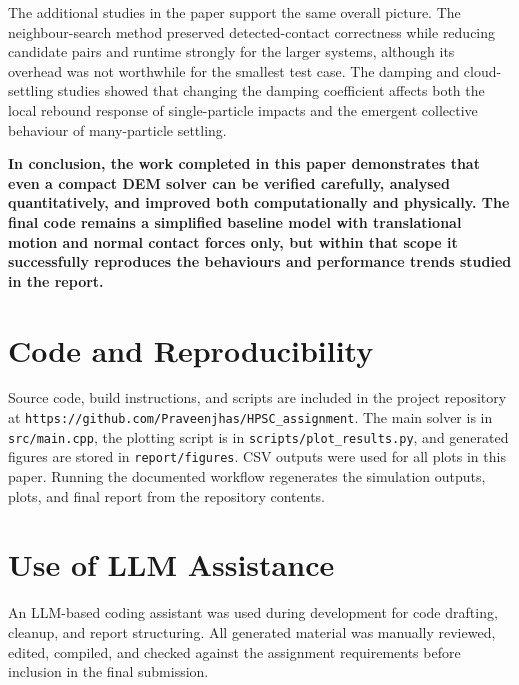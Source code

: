 \documentclass[conference]{IEEEtran}
\begin{document}
The additional studies in the paper support the same overall picture. The neighbour-search method preserved detected-contact correctness while reducing candidate pairs and runtime strongly for the larger systems, although its overhead was not worthwhile for the smallest test case. The damping and cloud-settling studies showed that changing the damping coefficient affects both the local rebound response of single-particle impacts and the emergent collective behaviour of many-particle settling.

\textbf{In conclusion, the work completed in this paper demonstrates that even a compact DEM solver can be verified carefully, analysed quantitatively, and improved both computationally and physically. The final code remains a simplified baseline model with translational motion and normal contact forces only, but within that scope it successfully reproduces the behaviours and performance trends studied in the report.}

\section*{Code and Reproducibility}
Source code, build instructions, and scripts are included in the project repository at \texttt{https://github.com/Praveenjhas/HPSC\_assignment}. The main solver is in \texttt{src/main.cpp}, the plotting script is in \texttt{scripts/plot\_results.py}, and generated figures are stored in \texttt{report/figures}. CSV outputs were used for all plots in this paper. Running the documented workflow regenerates the simulation outputs, plots, and final report from the repository contents.

\section*{Use of LLM Assistance}
An LLM-based coding assistant was used during development for code drafting, cleanup, and report structuring. All generated material was manually reviewed, edited, compiled, and checked against the assignment requirements before inclusion in the final submission.
\end{document}

